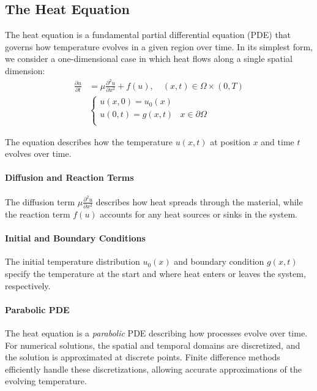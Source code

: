 \subsection{The Heat Equation}

The heat equation is a fundamental partial differential equation (PDE) that governs how temperature evolves in a given region over time. In its simplest form, we consider a one-dimensional case in which heat flows along a single spatial dimension:
\begin{align*}
  \frac{\partial u}{\partial t} & = \mu \frac{\partial^2 u}{\partial x^2} + f(u), \quad \left( x, t \right) \in \Omega \times \left(0, T\right) \tag{PDE} \\
                                &
  \begin{cases}
    u(x, 0) = u_0(x)  &                       \\
    u(0, t) = g(x, t) & x \in \partial \Omega \\
  \end{cases} \tag{BC}
\end{align*}\label{eq:heat_eq}

The equation describes how the temperature \(u(x, t)\) at position \(x\) and time \(t\) evolves over time.

\paragraph{Diffusion and Reaction Terms}
The diffusion term \(\mu \frac{\partial^2 u}{\partial x^2}\) describes how heat spreads through the material, while the reaction term \(f(u)\) accounts for any heat sources or sinks in the system.

\paragraph{Initial and Boundary Conditions}
The initial temperature distribution \(u_0(x)\) and boundary condition \(g(x, t)\) specify the temperature at the start and where heat enters or leaves the system, respectively.

\paragraph{Parabolic PDE}
The heat equation is a \emph{parabolic} PDE describing how processes evolve over time. For numerical solutions, the spatial and temporal domains are discretized, and the solution is approximated at discrete points. Finite difference methods efficiently handle these discretizations, allowing accurate approximations of the evolving temperature.

